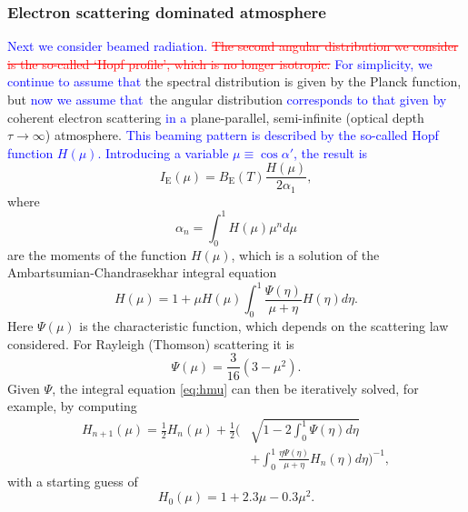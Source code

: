 \documentclass{aa}
\newcommand{\refe}[1]{\textcolor{blue}{{#1}}}
\newcommand{\refedel}[1]{\textcolor{red}{\sout{#1}}}
\begin{document}
\subsubsection{Electron scattering dominated atmosphere}

\refe{Next we consider beamed radiation.}
\refedel{The second angular distribution we consider is the so-called `Hopf profile', which is no longer isotropic.}
\refe{For simplicity, we continue to assume that} the spectral distribution is given by the Planck function, but \refe{now we assume that} the angular distribution \refe{corresponds to that given by} coherent electron scattering \refe{in a} plane-parallel, semi-infinite (optical depth $\tau \rightarrow \infty$) atmosphere.
\refe{This beaming pattern is described by the so-called Hopf function $H(\mu)$.}
\refe{Introducing a variable $\mu \equiv \cos\alpha'$, the result is}
\begin{equation}\label{eq:hopf}
  I_{\mathrm{E}}(\mu) = B_{\mathrm{E}}(T) \frac{H(\mu)}{2\alpha_1},
\end{equation}
where
\begin{equation}
  \alpha_n = \int_0^1 H(\mu) \mu^n d\mu
\end{equation}
are the moments of the function $H(\mu)$, which is a solution of the Ambartsumian-Chandrasekhar integral equation \citep[see e.g.][]{Cha60,Sob63}
\begin{equation}\label{eq:hmu}
  H(\mu) = 1 + \mu H(\mu) \int_0^1 \frac{\Psi(\eta)}{\mu + \eta} H(\eta) d\eta.
\end{equation}
Here $\Psi(\mu)$ is the characteristic function, which depends on the scattering law considered.
For Rayleigh (Thomson) scattering it is
\begin{equation}
  \Psi(\mu) = \frac{3}{16}(3-\mu^2).
\end{equation}
Given $\Psi$, the integral equation \eqref{eq:hmu} can then be iteratively solved, for example, by computing
\begin{equation}\begin{split}
    H_{n+1}(\mu) =  \frac{1}{2} H_n(\mu) + \frac{1}{2}\Biggl(& \sqrt{1-2\int_0^1 \Psi(\eta)d\eta} \\
                    &+ \int_0^1 \frac{\eta \Psi(\eta)}{\mu + \eta} H_n(\eta) d\eta \Biggr)^{-1},
\end{split}\end{equation}
with a starting guess of
\begin{equation}\label{eq:apprx_hopf}
  H_0(\mu) = 1 + 2.3\mu - 0.3\mu^2.
\end{equation}
\end{document}
